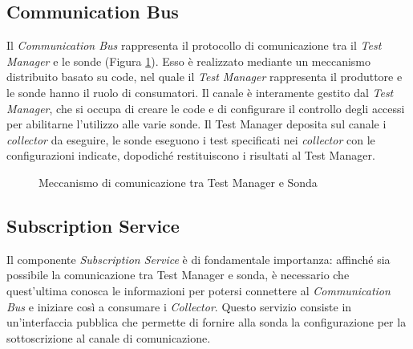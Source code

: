 \documentclass[../main.tex]{subfiles}
\begin{document}
\subsection{Communication Bus}
Il \textit{Communication Bus} rappresenta il protocollo di comunicazione tra il \textit{Test Manager} e le sonde (Figura \ref{fig:CommunicationSonda}).
Esso è realizzato mediante un meccanismo distribuito basato su code, nel quale il \textit{Test Manager} rappresenta il produttore e le sonde hanno il ruolo di consumatori.
Il canale è interamente gestito dal \textit{Test Manager}, che si occupa di creare le code e di configurare il controllo degli accessi per abilitarne l'utilizzo alle varie sonde.
Il Test Manager deposita sul canale i \textit{collector} da eseguire, le sonde eseguono i test specificati nei \textit{collector} con le configurazioni indicate, dopodiché restituiscono i risultati al Test Manager.
\begin{figure}[H]
\centering
{}
\caption{Meccanismo di comunicazione tra Test Manager e Sonda}\label{fig:CommunicationSonda}
\end{figure}
\newpage
\subsection {Subscription Service}
Il componente \textit{Subscription Service} è di fondamentale importanza: affinché sia possibile la comunicazione tra Test Manager e sonda, è necessario che quest'ultima conosca le informazioni per potersi connettere al \textit{Communication Bus} e iniziare così a consumare i \textit{Collector}.
Questo servizio consiste in un'interfaccia pubblica che permette di fornire alla sonda la configurazione per la sottoscrizione al canale di comunicazione.
\end{document}

